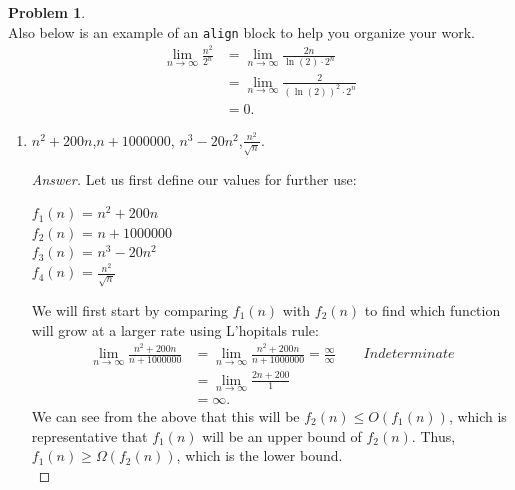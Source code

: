 \documentclass[11pt]{article}
\theoremstyle{definition}
\theoremstyle{definition}
\newtheorem{required}{Problem}
\theoremstyle{definition}
\begin{document}
\begin{required}
\noindent \\ Also below is an example of an \texttt{align} block to help you organize your work.
\begin{align*}
\lim_{n \to \infty} \frac{n^{2}}{2^{n}} &= \lim_{n \to \infty} \frac{2n}{\ln(2) \cdot 2^{n}} \\
&= \lim_{n \to \infty} \frac{2}{(\ln(2))^{2} \cdot 2^{n}} \\
&= 0.
\end{align*}
\newpage
\begin{enumerate} [label=(\alph*)]
\subsection{Problem 12\ref{1a}}
    \item \label{1a} $ n^2+200n$,\qquad  $n+1000000$, \qquad $n^3-20n^2$,\qquad  $\frac{n^2}{\sqrt{n}}$.
    \begin{proof}[Answer]
Let us first define our values for further use:
\begin{center}
$f_1(n)$ = $ n^2+200n$ \\
$f_2(n)$ =  $n+1000000$ \\
$f_3(n)$ = $n^3-20n^2$ \\
$f_4(n)$ = $\frac{n^2}{\sqrt{n}}$ \\
\end{center}
We will first start by comparing $f_1(n)$ with $f_2(n)$ to find which function will grow at a larger rate using L'hopitals rule: \\
\begin{align*}
\lim_{n \to \infty} \frac{n^2+200n}{n+1000000} &= \lim_{n \to \infty} \frac{n^2+200n}{n+1000000} = \frac{\infty}{\infty} \qquad Indeterminate \\
&= \lim_{n \to \infty} \frac{2n+200}{1} \\
&= \infty.
\end{align*}
We can see from the above that this will be  $f_2(n) \leq O(f_1(n))$, which is representative that $f_1(n)$ will be an upper bound of $f_2(n)$. Thus, $f_1(n) \geq \Omega(f_2(n))$, which is the lower bound. \\


\end{proof}
\end{enumerate}
\end{required}
\end{document}
